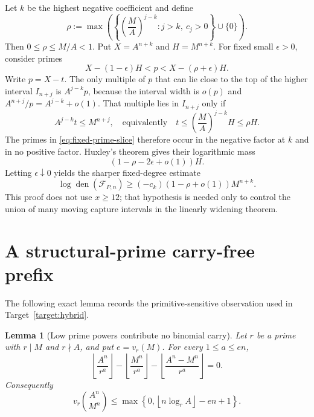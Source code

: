 \documentclass[11pt,oneside]{article}
\newtheorem{lemma}[theorem]{Lemma}
\theoremstyle{definition}
\theoremstyle{remark}
\newcommand{\den}{\operatorname{den}}
\newcommand{\cF}{\mathcal F}
\begin{document}
Let $k$ be the highest negative coefficient and define
\begin{equation}
 \rho:=\max\left(
 \left\{\left(\frac MA\right)^{j-k}:j>k,\ c_j>0\right\}\cup\{0\}
 \right).
 \label{eq:rho-fixed}
\end{equation}
Then $0\le\rho\le M/A<1$.  Put $X=A^{n+k}$ and $H=M^{n+k}$.  For fixed small
$\epsilon>0$, consider primes
\begin{equation}
 X-(1-\epsilon)H<p<X-(\rho+\epsilon)H.
 \label{eq:fixed-prime-slice}
\end{equation}
Write $p=X-t$.  The only multiple of $p$ that can lie close to the top of the higher interval
$I_{n+j}$ is $A^{j-k}p$, because the interval width is $o(p)$ and
$A^{n+j}/p=A^{j-k}+o(1)$.  That multiple lies in $I_{n+j}$ only if
\begin{equation}
 A^{j-k}t\le M^{n+j},
 \quad\text{equivalently}\quad
 t\le\left(\frac MA\right)^{j-k}H\le\rho H.
 \label{eq:fixed-capture-condition}
\end{equation}
The primes in \eqref{eq:fixed-prime-slice} therefore occur in the negative factor at $k$ and
in no positive factor.  Huxley's theorem gives their logarithmic mass
\begin{equation}
 (1-\rho-2\epsilon+o(1))H.
 \label{eq:fixed-slice-mass}
\end{equation}
Letting $\epsilon\downarrow0$ yields the sharper fixed-degree estimate
\begin{equation}
 \log\den(\cF_{P,n})
 \ge(-c_k)(1-\rho+o(1))M^{n+k}.
 \label{eq:fixed-sharp-den}
\end{equation}
This proof does not use $x\ge12$; that hypothesis is needed only to control the union of many
moving capture intervals in the linearly widening theorem.

\section{A structural-prime carry-free prefix}
\label{app:structural-prime}

The following exact lemma records the primitive-sensitive observation used in
Target~\ref{target:hybrid}.

\begin{lemma}[Low prime powers contribute no binomial carry]
\label{lem:carry-free-prefix}
Let $r$ be a prime with $r\mid M$ and $r\nmid A$, and put $e=v_r(M)$.  For every
$1\le a\le en$,
\begin{equation}
 \left\lfloor\frac{A^n}{r^a}\right\rfloor
 -\left\lfloor\frac{M^n}{r^a}\right\rfloor
 -\left\lfloor\frac{A^n-M^n}{r^a}\right\rfloor=0.
 \label{eq:carry-free-floor}
\end{equation}
Consequently
\begin{equation}
 v_r\binom{A^n}{M^n}
 \le
 \max\left\{0,
 \left\lfloor n\log_r A\right\rfloor-en+1
 \right\}.
 \label{eq:binomial-r-bound}
\end{equation}
\end{lemma}
\end{document}

